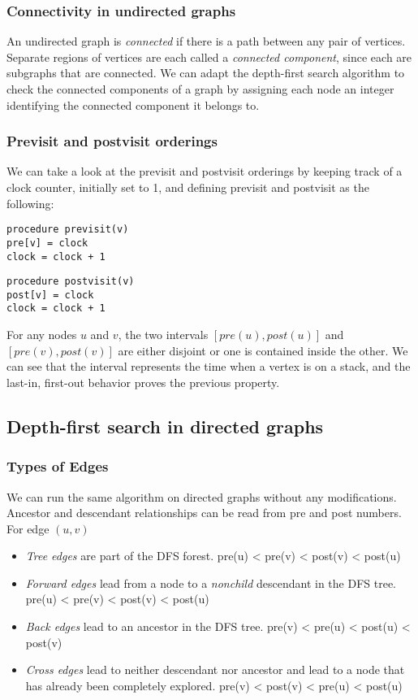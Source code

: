 \subsubsection{Connectivity in undirected graphs}
An undirected graph is \textit{connected} if there is a path between any pair of vertices.
Separate regions of vertices are each called a \textit{connected component}, since each are subgraphs that are connected.
We can adapt the depth-first search algorithm to check the connected components of a graph by assigning each node an integer identifying the connected component it belongs to.

\subsubsection{Previsit and postvisit orderings}
We can take a look at the previsit and postvisit orderings by keeping track of a clock counter, initially set to 1, and defining previsit and postvisit as the following:
\begin{verbatim}
procedure previsit(v)
pre[v] = clock
clock = clock + 1
\end{verbatim}

\begin{verbatim}
procedure postvisit(v)
post[v] = clock
clock = clock + 1
\end{verbatim}

\begin{property}
  For any nodes $u$ and $v$, the two intervals $[pre(u), post(u)]$ and $[pre(v), post(v)]$ are either disjoint or one is contained inside the other.
  We can see that the interval represents the time when a vertex is on a stack, and the last-in, first-out behavior proves the previous property.
\end{property}

\subsection{Depth-first search in directed graphs}

\subsubsection{Types of Edges}
We can run the same algorithm on directed graphs without any modifications.\\
Ancestor and descendant relationships can be read from pre and post numbers.
For edge $(u, v)$
\begin{itemize}
  \item{\textit{Tree edges} are part of the DFS forest. pre(u) < pre(v) < post(v) < post(u)}
  \item{\textit{Forward edges} lead from a node to a \textit{nonchild} descendant in the DFS tree. pre(u) < pre(v) < post(v) < post(u)}
  \item{\textit{Back edges} lead to an ancestor in the DFS tree. pre(v) < pre(u) < post(u) < post(v)}
  \item{\textit{Cross edges} lead to neither descendant nor ancestor and lead to a node that has already been completely explored. pre(v) < post(v) < pre(u) < post(u)}
\end{itemize}

